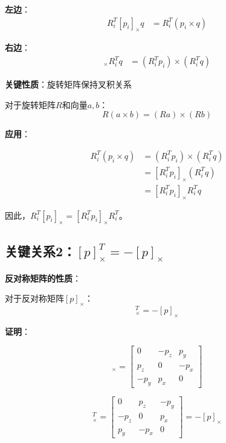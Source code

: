 \documentclass[12pt,a4paper]{article}
\begin{document}
\textbf{左边}：
\begin{align}
R_i^T [p_i]_{\times} q &= R_i^T (p_i \times q)
\end{align}

\textbf{右边}：
\begin{align}
[R_i^T p_i]_{\times} R_i^T q &= (R_i^T p_i) \times (R_i^T q)
\end{align}

\textbf{关键性质}：旋转矩阵保持叉积关系

对于旋转矩阵$R$和向量$a, b$：
\begin{equation}
R(a \times b) = (Ra) \times (Rb)
\end{equation}

\textbf{应用}：

\begin{align}
R_i^T (p_i \times q) &= (R_i^T p_i) \times (R_i^T q) \\
&= [R_i^T p_i]_{\times} (R_i^T q) \\
&= [R_i^T p_i]_{\times} R_i^T q
\end{align}

因此，$R_i^T [p_i]_{\times} = [R_i^T p_i]_{\times} R_i^T$。

\subsection{关键关系2：$[p]_{\times}^T = -[p]_{\times}$}

\textbf{反对称矩阵的性质}：

对于反对称矩阵$[p]_{\times}$：
\begin{equation}
[p]_{\times}^T = -[p]_{\times}
\end{equation}

\textbf{证明}：

\begin{equation}
[p]_{\times} = \begin{bmatrix}
0 & -p_z & p_y \\
p_z & 0 & -p_x \\
-p_y & p_x & 0
\end{bmatrix}
\end{equation}

\begin{equation}
[p]_{\times}^T = \begin{bmatrix}
0 & p_z & -p_y \\
-p_z & 0 & p_x \\
p_y & -p_x & 0
\end{bmatrix} = -[p]_{\times}
\end{equation}
\end{document}
